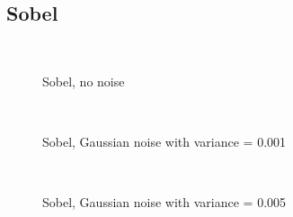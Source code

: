 \documentclass[10pt,a4paper]{article}
\begin{document}
\subsection{Sobel}
\begin{figure}[H]
  \centering
     \\
  \caption{Sobel, no noise}
  \label{fig:sobel_no_noise}
\end{figure}
\begin{figure}[H]
  \centering
     \\
  \caption{Sobel, Gaussian noise with variance = 0.001}
  \label{fig:sobel_001}
\end{figure}
\begin{figure}[H]
  \centering
     \\
  \caption{Sobel, Gaussian noise with variance = 0.005}
  \label{fig:sobel_005}
\end{figure}
\end{document}
